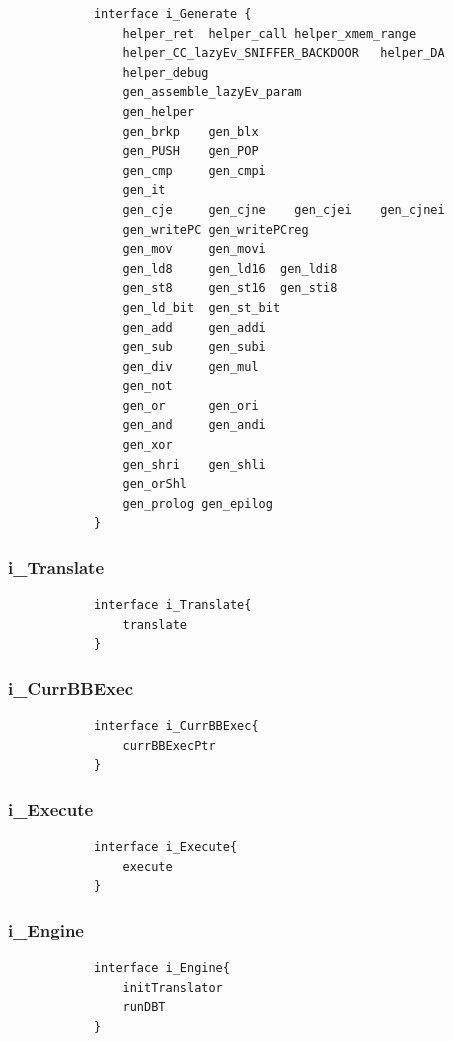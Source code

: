 \documentclass{report}
\begin{document}
			\begin{lstlisting}
			interface i_Generate {
				helper_ret	helper_call	helper_xmem_range	
				helper_CC_lazyEv_SNIFFER_BACKDOOR	helper_DA	
				helper_debug
				gen_assemble_lazyEv_param
				gen_helper	
				gen_brkp  	gen_blx
				gen_PUSH  	gen_POP
				gen_cmp 	gen_cmpi
				gen_it  
				gen_cje  	gen_cjne	gen_cjei  	gen_cjnei
				gen_writePC gen_writePCreg
				gen_mov  	gen_movi
				gen_ld8  	gen_ld16  gen_ldi8
				gen_st8	 	gen_st16  gen_sti8
				gen_ld_bit  gen_st_bit
				gen_add  	gen_addi
				gen_sub  	gen_subi
				gen_div  	gen_mul
				gen_not
				gen_or  	gen_ori
				gen_and  	gen_andi
				gen_xor
				gen_shri 	gen_shli
				gen_orShl
				gen_prolog gen_epilog
			}
			\end{lstlisting}
			
			\subsubsection*{i\_Translate}
			
			\begin{lstlisting}
			interface i_Translate{
				translate 
			}
			\end{lstlisting}

			\subsubsection*{i\_CurrBBExec}
			
			\begin{lstlisting}
			interface i_CurrBBExec{
				currBBExecPtr
			}
			\end{lstlisting}
			
			\subsubsection*{i\_Execute}
			
			\begin{lstlisting}
			interface i_Execute{
				execute
			}
			\end{lstlisting}
			
			\subsubsection*{i\_Engine}
			
			\begin{lstlisting}
			interface i_Engine{
				initTranslator
				runDBT
			}
			\end{lstlisting}
			
\end{document}
